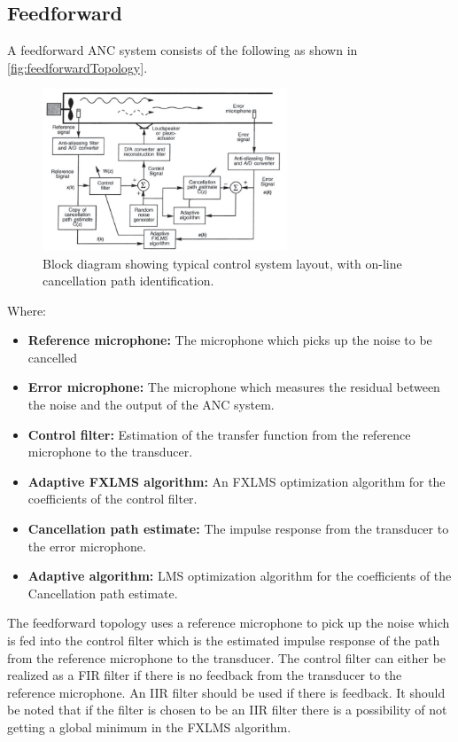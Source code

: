 \subsection*{Feedforward}
A feedforward ANC system consists of the following as shown in \autoref{fig:feedforwardTopology}.
\begin{figure}[H]
	\centering
	\includegraphics[width=0.65\textwidth]{figures/BasicSystem/feedforward}
	\caption{Block diagram showing typical control system layout, with on-line cancellation path identification. \cite{Hansen2}}
	\label{fig:feedforwardTopology}
\end{figure}
Where:
\begin{itemize}
\item \textbf{Reference microphone:} The microphone which picks up the noise to be cancelled 
\item \textbf{Error microphone:} The microphone which measures the residual between the noise and the output of the ANC system.
\item \textbf{Control filter:} Estimation of the transfer function from the reference microphone to the transducer. 
\item \textbf{Adaptive FXLMS algorithm:} An FXLMS optimization algorithm for the coefficients of the control filter.
\item \textbf{Cancellation path estimate:} The impulse response from the transducer to the error microphone.
\item \textbf{Adaptive algorithm:} LMS optimization algorithm for the coefficients of the Cancellation path estimate.
\end{itemize}

The feedforward topology uses a reference microphone to pick up the noise which is fed into the control filter which is the estimated impulse response of the path from the reference microphone to the transducer. The control filter can either be realized as a FIR filter if there is no feedback from the transducer to the reference microphone. An IIR filter should be used if there is feedback. It should be noted that if the filter is chosen to be an IIR filter there is a possibility of not getting a global minimum in the FXLMS algorithm.

